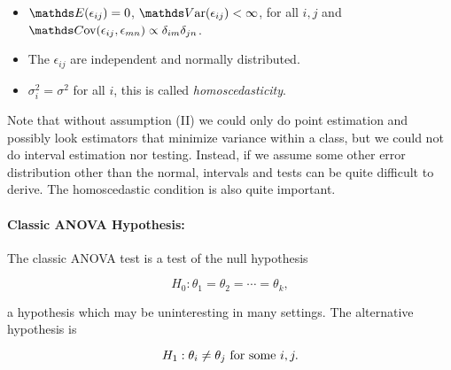 \documentclass{homework}
\begin{document}
\begin{itemize}
    \item $\E (\epsilon_{ij}) = 0$, $\var (\epsilon_{ij}) < \infty$, for all $i,j$ and $\cov(\epsilon_{ij}, \epsilon_{mn}) \propto \delta_{im}\delta_{jn}$. 
    \item The $\epsilon_{ij}$ are independent and normally distributed.
    \item $\sigma_i^2 = \sigma^2$ for all $i$, this is called \textit{homoscedasticity}. \\
\end{itemize}

Note that without assumption (II) we could only do point estimation and possibly look estimators that minimize variance within a class, but we could not do interval estimation nor testing. Instead, if we assume some other error distribution other than the normal, intervals and tests can be quite difficult to derive. The homoscedastic condition is also quite important. \\

\paragraph{\textbf{Classic ANOVA Hypothesis}:}

The classic ANOVA test is a test of the null hypothesis

$$
H_0 : \theta_1 = \theta_2 = \cdots = \theta_k,
$$

a hypothesis which may be uninteresting in many settings. The alternative hypothesis is 

$$
H_1 : \theta_i \neq \theta_j \textnormal{ for some } i,j .
$$
\end{document}

